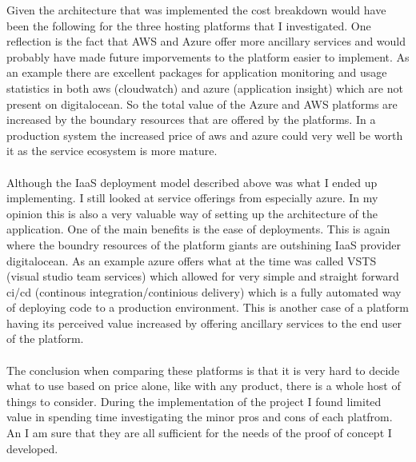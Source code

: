 \documentclass[]{uiophd}
\begin{document}
Given the architecture that was implemented the cost breakdown would have been the following for the three hosting platforms that I investigated. One reflection is the fact that AWS and Azure offer more ancillary services and would probably have made future imporvements to the platform easier to implement. As an example there are excellent packages for application monitoring and usage statistics in both aws (cloudwatch) and azure (application insight) which are not present on digitalocean. So the total value of the Azure and AWS platforms are increased by the boundary resources that are offered by the platforms. In a production system the increased price of aws and azure could very well be worth it as the service ecosystem is more mature. 
\\\\
Although the IaaS deployment model described above was what I ended up implementing. I still looked at service offerings from especially azure. In my opinion this is also a very valuable way of setting up the architecture of the application. One of the main benefits is the ease of deployments. This is again where the boundry resources of the platform giants are outshining IaaS provider digitalocean. As an example azure offers what at the time was called VSTS (visual studio team services) which allowed for very simple and straight forward ci/cd (continous integration/continious delivery) which is a fully automated way of deploying code to a production environment. This is another case of a platform having its perceived value increased by offering ancillary services to the end user of the platform. 
\\\\
The conclusion when comparing these platforms is that it is very hard to decide what to use based on price alone, like with any product, there is a whole host of things to consider. During the implementation of the project I found limited value in spending time investigating the minor pros and cons of each platfrom. An I am sure that they are all sufficient for the needs of the proof of concept I developed.
\end{document}

